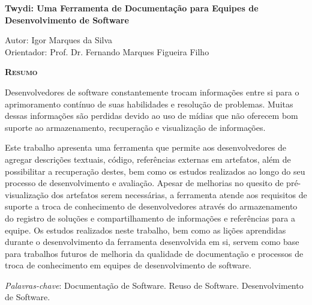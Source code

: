 \begin{center}
	{\Large{\textbf{Twydi: Uma Ferramenta de Documentação para Equipes de Desenvolvimento de Software}}}
\end{center}

\vspace{1cm}

\begin{flushright}
	Autor: Igor Marques da Silva\\
	Orientador: Prof. Dr. Fernando Marques Figueira Filho
\end{flushright}

\vspace{1cm}

\begin{center}
	\Large{\textsc{\textbf{Resumo}}}
\end{center}

\noindent
Desenvolvedores de software constantemente trocam informações entre si para o aprimoramento contínuo de suas habilidades e resolução de problemas. Muitas dessas informações são perdidas devido ao uso de mídias que não oferecem bom suporte ao armazenamento, recuperação e visualização de informações.

Este trabalho apresenta uma ferramenta que permite aos desenvolvedores de agregar descrições textuais, código, referências externas em artefatos, além de possibilitar a recuperação destes, bem como os estudos realizados ao longo do seu processo de desenvolvimento e avaliação. Apesar de melhorias no quesito de pré-visualização dos artefatos serem necessárias, a ferramenta atende aos requisitos de suporte a troca de conhecimento de desenvolvedores através do armazenamento do registro de soluções e compartilhamento de informações e referências para a equipe. Os estudos realizados neste trabalho, bem como as lições aprendidas durante o desenvolvimento da ferramenta desenvolvida em si, servem como base para trabalhos futuros de melhoria da qualidade de documentação e processos de troca de conhecimento em equipes de desenvolvimento de software.

\noindent\textit{Palavras-chave}: Documentação de Software. Reuso de Software. Desenvolvimento de Software.
